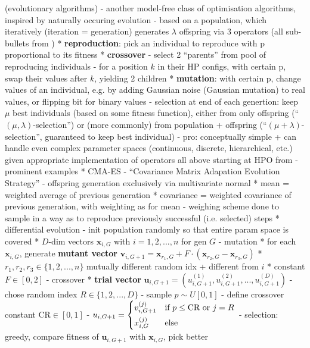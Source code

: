 \documentclass[twoside,11pt]{article}
\begin{document}
(evolutionary algorithms)
- another model-free class of optimisation algorithms, inspired by naturally occuring evolution
- based on a population, which iteratively (iteration = generation) generates $\lambda$ offspring via 3 operators (all sub-bullets from \citet[pp. 10-]{genetic_algos})
  * \textbf{reproduction}: pick an individual to reproduce with p proportional to its fitness
  * \textbf{crossover}
    - select 2 ``parents'' from pool of reproducing individuals
    - for a position $k$ in their HP configs, with certain p, swap their values after $k$, yielding 2 children
  * \textbf{mutation}: with certain p, change values of an individual, e.g. by adding Gaussian noise (Gaussian mutation) to real values, or flipping bit for binary values
- selection at end of each genertion: keep $\mu$ best individuals (based on some fitness function), either from only offspring (``$(\mu,\lambda)$-selection'')
  or (more commonly) from population + offspring (``$(\mu+\lambda)$-selection'', guaranteed to keep best individual)
- pro: conceptually simple + can handle even complex parameter spaces (continuous, discrete, hierarchical, etc.) given appropriate implementation of operators
all above starting at HPO from \citep[chap. 1.3]{feurer_hyperparameter_2019}
- prominent examples
  * CMA-ES
    - ``Covariance Matrix Adapation Evolution Strategy''
    - offspring generation exclusively via multivariate normal \citep[p. 8]{hansen2023cmaevolutionstrategytutorial}
      * mean = weighted average of previous generation
      * covariance = weighted covariance of previous generation, with weighting as for mean
    - weighing scheme done to sample in a way as to reproduce previously successful (i.e. selected) steps \citep[p. 11]{hansen2023cmaevolutionstrategytutorial}
  * differential evolution \citep[-]{differential_evolution}
    - init population randomly so that entire param space is covered
      * $D$-dim vectors $\boldsymbol{x}_{i,G}$ with $i=1,2,...,n$ for gen $G$
    - mutation
      * for each $\boldsymbol{x}_{i,G}$, generate \textbf{mutant vector} $\boldsymbol{v}_{i,G+1}=\boldsymbol{x}_{r_1,G}+F\cdot(\boldsymbol{x}_{r_2,G}-\boldsymbol{x}_{r_3,G})$
      * $r_1,r_2,r_3\in\{1,2,...,n\}$ mutually different random idx + different from $i$
      * constant $F\in[0,2]$
    - crossover
      * \textbf{trial vector} $\boldsymbol{u}_{i,G+1}=(u_{i,G+1}^{(1)},u_{i,G+1}^{(2)},...,u_{i,G+1}^{(D)})$
        - chose random index $R\in\{1,2,...,D\}$
        - sample $p\sim U[0,1]$
        - define crossover constant $\text{CR}\in[0,1]$
        - $u_{i,G+1} = \begin{dcases}
          v_{i,G+1}^{(j)} & \text{if } p\le\text{CR}\text{ or } j=R \\
          x_{i,G}^{(j)} & \text{else}
         \end{dcases}$
    - selection: greedy, compare fitness of $\boldsymbol{u}_{i,G+1}$ with $\boldsymbol{x}_{i,G}$, pick better
\end{document}
